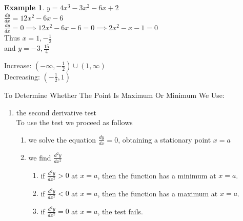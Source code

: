 \documentclass[11pt,a4paper]{article}
\theoremstyle{definition}
\newtheorem{example}[thm]{Example}
\begin{document}
\begin{example}

$y=4x^3-3x^2-6x+2$\\

$\frac{dy}{dx}=12x^2-6x-6$\\

$\frac{dy}{dx}=0\implies 12x^2-6x-6=0\implies 2x^2-x-1=0$\\

Thus $x=1,-\frac{1}{2}$\\

and $y=-3, \frac{15}{4}$\\



\begin{figure}[H]
\centering
{}
\end{figure}

Increase: $\left(-\infty,-\frac{1}{2}\right)\cup (1,\infty)$\\

Decreasing: $\left(-\frac{1}{2},1\right)$
\end{example}
\pagebreak
To Determine Whether The Point Is Maximum Or Minimum We Use:
\begin{enumerate}
\item[] the second derivative test \\

To use the test we proceed as follows
\begin{enumerate}
     \item we solve the equation $\frac{dy}{dx}=0$, obtaining a stationary point $x=a$
     \item we find $\frac{d^2y}{dx^2}$
\begin{enumerate}
             \item if $\frac{d^2y}{dx^2}>0$ at $x=a$, then the function has a minimum at $x=a$.
             
             \item if $\frac{d^2y}{dx^2}<0$ at $x=a$, then the function has a maximum at $x=a$.
             
             \item if $\frac{d^2y}{dx^2}=0$ at $x=a$, the test fails.\\
\end{enumerate}
\end{enumerate}
\end{enumerate}
\end{document}
